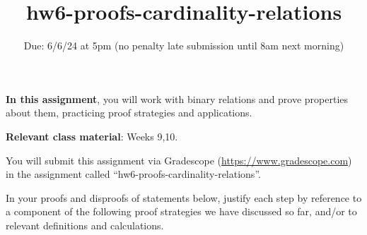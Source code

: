 

\title{hw6-proofs-cardinality-relations}
\date{Due: 6/6/24 at 5pm (no penalty late submission until 8am next morning)}

\maketitle
\thispagestyle{fancy}

{\bf In this assignment}, you will work with binary relations and prove 
properties about them, practicing proof strategies and applications.

{\bf Relevant class material}: Weeks 9,10.

You will submit this assignment via Gradescope
(\href{https://www.gradescope.com}{https://www.gradescope.com}) 
in the assignment called ``hw6-proofs-cardinality-relations''.

\instructions

In your proofs and disproofs of statements below, justify each  step
by reference to  a component of the  following proof  strategies
we  have discussed so far, and/or to relevant definitions and calculations.

\vspace{-10pt}

